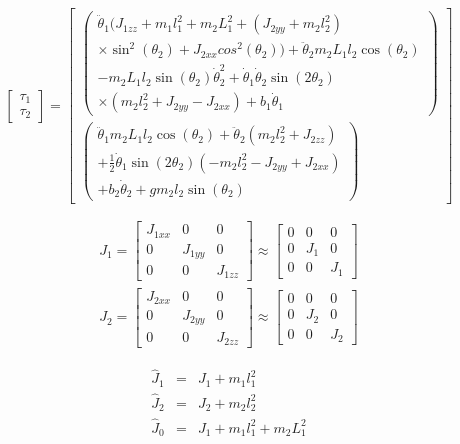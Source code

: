 \begin{equation}
\begin{bmatrix}
\tau_1 \\
\tau_2
\end{bmatrix}
=
\begin{bmatrix}
\begin{pmatrix}
\ddot{\theta}_1(J_{1zz}+m_1l^2_1+m_2L^2_1+(J_{2yy}+m_2l^2_2) 						\\
\times \sin^2(\theta_2)+J_{2xx}cos^2(\theta_2))+\ddot{\theta}_2m_2L_1l_2\cos(\theta_2)			\\
-m_2L_1l_2\sin(\theta_2)\dot{\theta}^2_2+\dot{\theta}_1\dot{\theta}_2\sin(2\theta_2)	\\
\times(m_2l^2_2+J_{2yy}-J_{2xx})+b_1\dot{\theta}_1
\end{pmatrix}
\\
\begin{pmatrix}
\ddot{\theta}_1m_2L_1l_2\cos(\theta_2)+\ddot{\theta}_2(m_2l^2_2+J_{2zz})	\\
+\frac{1}{2}\dot{\theta}_1\sin(2\theta_2)(-m_2l^2_2-J_{2yy}+J_{2xx})						\\
+b_2\dot{\theta}_2+gm_2l_2\sin(\theta_2)
\end{pmatrix}
\end{bmatrix}
\end{equation}

\begin{eqnarray}
J_1=
\begin{bmatrix}
J_{1xx} & 0 & 0\\
0 & J_{1yy} & 0\\
0 & 0 & J_{1zz}
\end{bmatrix}
\approx
\begin{bmatrix}
0 & 0 & 0\\
0 & J_{1} & 0\\
0 & 0 & J_{1}
\end{bmatrix}
\nonumber \\
J_2=
\begin{bmatrix}
J_{2xx} & 0 & 0\\
0 & J_{2yy} & 0\\
0 & 0 & J_{2zz}
\end{bmatrix}
\approx
\begin{bmatrix}
0 & 0 & 0\\
0 & J_{2} & 0\\
0 & 0 & J_{2}
\end{bmatrix}
\end{eqnarray}

\begin{eqnarray}
\hat{J}_1 &=& J_1 + m_1l^2_1	\nonumber	\\
\hat{J}_2 &=& J_2 + m_2l^2_2	\nonumber	\\
\hat{J}_0 &=& J_1 + m_1l^2_1 + m_2L^2_1
\end{eqnarray}

